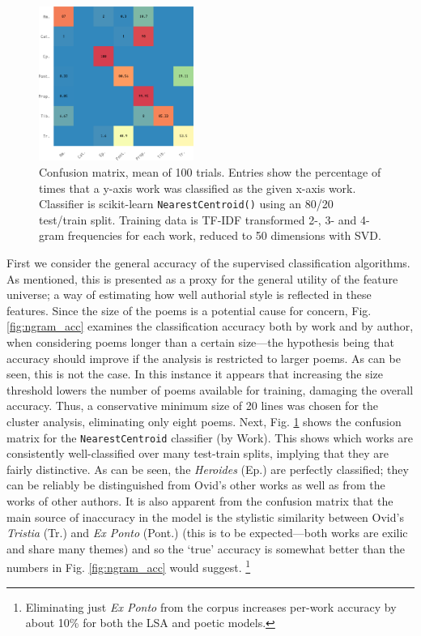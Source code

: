 \documentclass[twocolumn, switch, a4paper]{article} %
\begin{document}
\begin{figure}
\caption{
  Confusion matrix, mean of 100 trials. Entries show the percentage of times
that a y-axis work was classified as the given x-axis work. Classifier is
scikit-learn \texttt{NearestCentroid()} using an 80/20 test/train split.
Training data is TF-IDF transformed 2-, 3- and 4-gram frequencies for each
work, reduced to 50 dimensions with SVD. }
\label{fig:cm_ngrams}
\includegraphics[width=0.45\textwidth]{figures/cm_ngrams-crop.pdf}
\end{figure}

First we consider the general accuracy of the supervised classification
algorithms. As mentioned, this is presented as a proxy for the general utility
of the feature universe; a way of estimating how well authorial style is
reflected in these features. Since the size of the poems is a potential cause
for concern, Fig. \ref{fig:ngram_acc} examines the classification accuracy both
by work and by author, when considering poems longer than a certain size---the
hypothesis being that accuracy should improve if the analysis is restricted to
larger poems. As can be seen, this is not the case. In this instance it appears
that increasing the size threshold lowers the number of poems available for
training, damaging the overall accuracy. Thus, a conservative minimum size of 20
lines was chosen for the cluster analysis, eliminating only eight poems. Next,
Fig. \ref{fig:cm_ngrams} shows the confusion matrix for the
\texttt{NearestCentroid} classifier (by Work). This shows which works are
consistently well-classified over many test-train splits, implying that they are
fairly distinctive. As can be seen, the \emph{Heroides} (Ep.) are perfectly
classified; they can be reliably be distinguished from Ovid's other works as
well as from the works of other authors. It is also apparent from the confusion
matrix that the main source of inaccuracy in the model is the stylistic
similarity between Ovid's \emph{Tristia} (Tr.) and \emph{Ex Ponto} (Pont.) (this
is to be expected---both works are exilic and share many themes) and so the
`true' accuracy is somewhat better than the numbers in Fig. \ref{fig:ngram_acc}
would suggest.%
%
    \footnote{Eliminating just \emph{Ex Ponto} from the corpus increases
    per-work accuracy by about 10\% for both the LSA and poetic models.}
%
\end{document}
